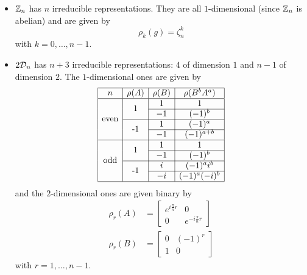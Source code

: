 \documentclass[a4paper,10pt]{article}
\begin{document}
            \begin{itemize}
                \item $\mathbb{Z}_n$ has $n$ irreducible representations. They are all $1$-dimensional (since $\mathbb{Z}_n$ is abelian) and are given by
                \begin{equation}
                    \rho_k(g)=\zeta^k_n
                \end{equation}
                with $k=0,\dots,n-1$.
                \item $2\mathcal{D}_n$ has $n+3$ irreducible representations: $4$ of dimension $1$ and $n-1$ of dimension $2$. The $1$-dimensional ones are given by
                \begin{equation*}
                \begin{array}{|c|c|c|c|}
                    \hline
                    n & \rho(A) & \rho(B) & \rho(B^bA^a) \\
                    \hline
                    \multirow[c]{4}{*}{\text{even}} & \multirow[c]{2}{*}{1} & 1 & 1 \\ \cline{3-4}
                    & & -1 & (-1)^b \\ \cline{2-4}
                    & \multirow[c]{2}{*}{-1} & 1 & (-1)^a \\ \cline{3-4}
                    & & -1 & (-1)^{a+b} \\
                    \hline
                    \multirow[c]{4}{*}{\text{odd}} & \multirow[c]{2}{*}{1} & 1 & 1 \\ \cline{3-4}
                    & & -1 & (-1)^b \\ \cline{2-4}
                    & \multirow[c]{2}{*}{-1} & i & (-1)^ai^b \\ \cline{3-4}
                    & & -i & (-1)^a(-i)^b \\
                    \hline
                \end{array}
                \end{equation*}
                and the $2$-dimensional ones are given binary by
                \begin{align*}
                    \rho_r(A) &= 
                    \begin{bmatrix}
                        e^{i\frac{\pi}{n}r} & 0\\
                        0 & e^{-i\frac{\pi}{n}r} 
                    \end{bmatrix}\\
                    \rho_r(B) &= 
                    \begin{bmatrix}
                        0 & (-1)^r \\
                        1 & 0
                    \end{bmatrix}
                \end{align*}
                with $r=1,\dots,n-1$.
            \end{itemize}
\end{document}
